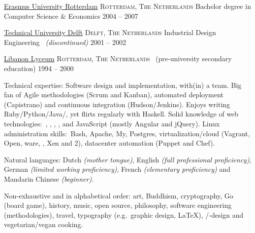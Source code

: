 \documentclass[10pt,a4paper]{article}
\begin{document}
\spacedhrule{-0.2em}{-0.4em}


\headedsection
  {\href{http://www.eur.nl/english}{Erasmus University Rotterdam}}
  {\textsc{Rotterdam, The Netherlands}} {%
  \headedsubsection
    {Bachelor degree in Computer Science \& Economics}
    {2004 -- 2007}
    {}
}

\headedsection
  {\href{http://www.tudelft.nl/en}{Technical University Delft}}
  {\textsc{Delft, The Netherlands}} {%
  \headedsubsection
    {Industrial Design Engineering \textnormal{\textit{~(discontinued)}}}
    {2001 -- 2002} {}
}

\headedsection
  {\href{http://www.libanonlyceum.nl}{Libanon Lyceum}}
  {\textsc{Rotterdam, The Netherlands}} {%
  \headedsubsection
    { \textnormal{~(pre-university secondary education)}}
    {1994 -- 2000} {}
}


\spacedhrule{0.5em}{-0.4em}


\inlineheadsection  %
  {Technical expertise:}
  {Software design and implementation, with(in) a team.  Big fan of Agile methodologies (Scrum and Kanban), automated deployment (Capistrano) and continuous integration (Hudson/Jenkins).  Enjoys writing Ruby/\nsp Python/\nsp Java/\nsp \CPP, yet flirts regularly with Haskell.  Solid knowledge of web technologies:\ , , , ,  and JavaScript (mostly Angular and jQuery).  Linux administration skills:\ Bash, Apache, My, Postgres, virtualization/cloud (Vagrant, Open, ware, , Xen and 2), datacenter automation (Puppet and Chef).}

\vspace{0.5em}
\inlineheadsection
  {Natural languages:}
  {Dutch \emph{(mother tongue)}, English \emph{(full professional proficiency)}, German \emph{(limited working proficiency)}, French \emph{(elementary proficiency)} and Mandarin Chinese \emph{(beginner)}.}


\spacedhrule{1.6em}{-0.4em}


\inlineheadsection
  {Non-exhaustive and in alphabetical order:}
  {art, Buddhism, cryptography, Go (board game), history, music, open source, philosophy, software engineering (methodologies), travel, typography (e.g.\ graphic design, \LaTeX), /-design and vegetarian/vegan cooking.}
\end{document}
